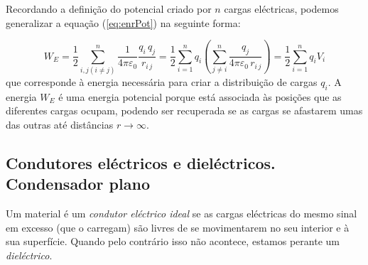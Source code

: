 \documentclass[a4paper,twoside,11pt]{report}      %
\begin{document}
Recordando a definição do potencial criado por $n$ cargas eléctricas, podemos generalizar a equação (\ref{eq:enrPot}) na seguinte forma:

\begin{equation}%
 W_E =  \frac{1}{2} \sum_{i,j (i\ne j)}^n \frac{ 1 }{4 \pi \varepsilon_0} \frac{ q_i \, q_j }{r_{i\,j}}  = 
	 \frac{1}{2} \sum_{i=1}^n q_i \left( \sum_{j \ne i}^n \frac{ q_j }{4 \pi \varepsilon_0 \,r_{i\,j}} \right) =
	\frac{1}{2} \sum_{i=1}^n q_i V_i
\end{equation}
que corresponde à energia necessária para criar a distribuição de cargas $q_i$. A energia $W_E$ é uma energia potencial porque está associada às posições que as diferentes cargas ocupam, podendo ser recuperada se as cargas se afastarem umas das outras até distâncias $r \to \infty$.

\subsection{\sf Condutores eléctricos e dieléctricos. Condensador plano}
Um material é um \emph{condutor eléctrico ideal} se as cargas eléctricas do mesmo sinal em excesso (que o carregam) são livres de se movimentarem no seu interior e à sua superfície. Quando pelo contrário isso não acontece, estamos perante um \emph{dieléctrico}.
\end{document}
